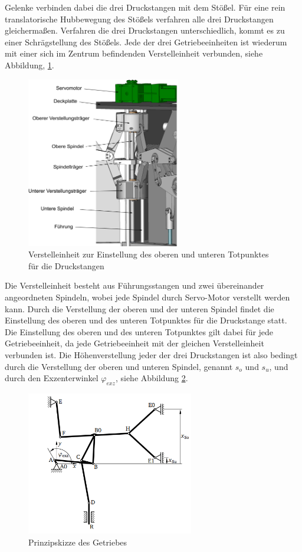 Gelenke verbinden dabei die drei Druckstangen mit dem Stößel. Für eine rein translatorische Hubbewegung des Stößels verfahren alle drei Druckstangen gleichermaßen. Verfahren die drei Druckstangen unterschiedlich, kommt es zu einer Schrägstellung des Stößels. Jede der drei Getriebeeinheiten ist wiederum mit einer sich im Zentrum befindenden Verstelleinheit verbunden, siehe Abbildung, \ref{fig:verstelleinheit}.
\begin{figure} [h]
	\centering
	\includegraphics[width=0.6\textwidth]{images/verstelleinheit}
	\caption{Verstelleinheit zur Einstellung des oberen und unteren Totpunktes für die Druckstangen \cite{Rakowitsch.2018}}
	\label{fig:verstelleinheit}
\end{figure}
Die Verstelleinheit besteht aus Führungsstangen und zwei übereinander angeordneten Spindeln, wobei jede Spindel durch Servo-Motor verstellt werden kann. Durch die Verstellung der oberen und der unteren Spindel findet die Einstellung des oberen und des unteren Totpunktes für die Druckstange statt. Die Einstellung des oberen und des unteren Totpunktes gilt dabei für jede Getriebeeinheit, da jede Getriebeeinheit mit der gleichen Verstelleinheit verbunden ist. Die Höhenverstellung jeder der drei Druckstangen ist also bedingt durch die Verstellung der oberen und unteren Spindel, genannt $s_o$ und $s_u$, und durch den Exzenterwinkel $\varphi_{exz}$, siehe Abbildung \ref{fig:prinzipskizze}.

\begin{figure} [h]
	\centering
	\includegraphics[width=0.65\textwidth]{images/prinzipskizze}
	\caption{Prinzipskizze des Getriebes \cite{Rakowitsch.2018}}
	\label{fig:prinzipskizze}
\end{figure}


